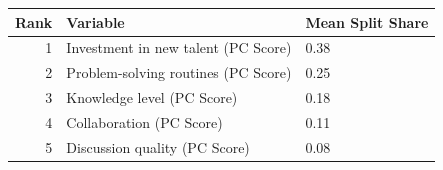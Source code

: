 
\begin{tabular}{rll}
\toprule
Rank & Variable & Mean Split Share\\
\midrule
1 & Investment in new talent (PC Score) & 0.38\\
2 & Problem-solving routines (PC Score) & 0.25\\
3 & Knowledge level (PC Score) & 0.18\\
4 & Collaboration (PC Score) & 0.11\\
5 & Discussion quality (PC Score) & 0.08\\
\bottomrule
\end{tabular}
